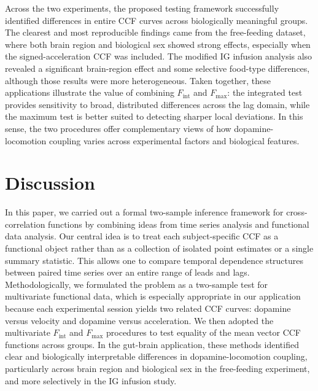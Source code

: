 \documentclass[12pt]{article}
\begin{document}
Across the two experiments, the proposed testing framework successfully identified differences in entire CCF curves across biologically meaningful groups. The clearest and most reproducible findings came from the free-feeding dataset, where both brain region and biological sex showed strong effects, especially when the signed-acceleration CCF was included. The modified IG infusion analysis also revealed a significant brain-region effect and some selective food-type differences, although those results were more heterogeneous. Taken together, these applications illustrate the value of combining \(F_{\mathrm{int}}\) and \(F_{\max}\): the integrated test provides sensitivity to broad, distributed differences across the lag domain, while the maximum test is better suited to detecting sharper local deviations. In this sense, the two procedures offer complementary views of how dopamine-locomotion coupling varies across experimental factors and biological features.

\section{Discussion}

In this paper, we carried out a formal two-sample inference framework for cross-correlation functions by combining ideas from time series analysis and functional data analysis. Our central idea is to treat each subject-specific CCF as a functional object rather than as a collection of isolated point estimates or a single summary statistic. This allows one to compare temporal dependence structures between paired time series over an entire range of leads and lags. Methodologically, we formulated the problem as a two-sample test for multivariate functional data, which is especially appropriate in our application because each experimental session yields two related CCF curves: dopamine versus velocity and dopamine versus acceleration. We then adopted the multivariate \(F_{\mathrm{int}}\) and \(F_{\max}\) procedures to test equality of the mean vector CCF functions across groups. In the gut-brain application, these methods identified clear and biologically interpretable differences in dopamine-locomotion coupling, particularly across brain region and biological sex in the free-feeding experiment, and more selectively in the IG infusion study. 
\end{document}
